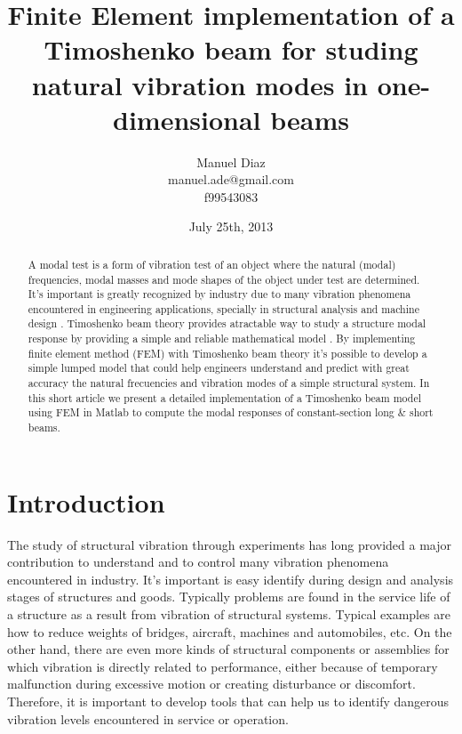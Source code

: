 \documentclass[10pt,twoside,a4paper]{article}
\begin{document}
\title{Finite Element implementation of a Timoshenko beam for studing natural vibration modes in one-dimensional beams}
\date{July 25th, 2013}
\author{Manuel Diaz \\ manuel.ade@gmail.com \\ f99543083}

\maketitle

\begin{abstract}
A modal test is a form of vibration test of an object where the natural (modal) frequencies, modal masses and mode shapes of the object under test are determined. It's important is greatly recognized by industry due to many vibration phenomena encountered in engineering applications, specially in structural analysis and machine design \cite{Enboa_etal2002}. Timoshenko beam theory provides atractable way to study a structure modal response by providing a simple and reliable mathematical model \cite{Wiki}. By implementing finite element method (FEM) with Timoshenko beam theory it's possible to develop a simple lumped model that could help engineers understand and predict with great accuracy the natural frecuencies and vibration modes of a simple structural system. In this short article we present a detailed implementation of a Timoshenko beam model using FEM in Matlab to compute the modal responses of constant-section long \& short beams.
\end{abstract}

\section{Introduction}
The study of structural vibration through experiments has long provided a major contribution to understand and to control many vibration phenomena encountered in industry. It's important is easy identify during design and analysis stages of structures and goods. Typically problems are found in the service life of a structure as a result from vibration of structural systems. Typical examples are how to reduce weights of bridges, aircraft, machines and automobiles, etc. On the other hand, there are even more kinds of structural components or assemblies for which vibration is directly related to performance, either because of temporary malfunction during excessive motion or creating disturbance or discomfort. Therefore, it is important to develop tools that can help us to identify dangerous vibration levels encountered in service or operation.
\end{document}
